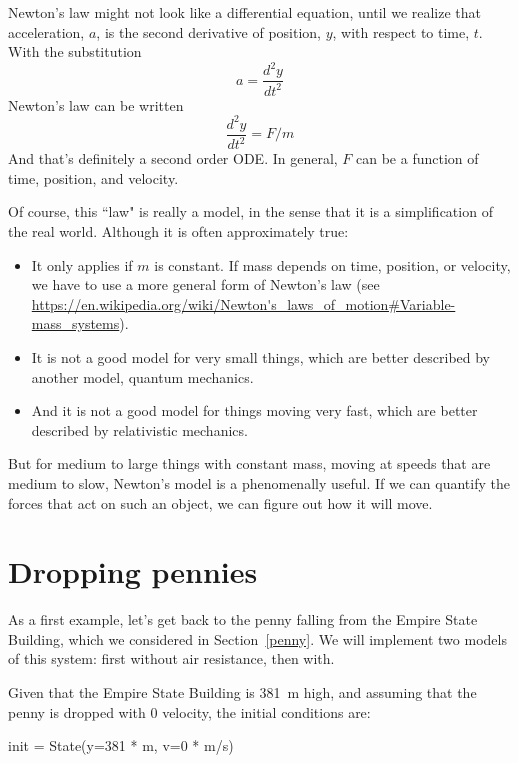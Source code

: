\documentclass[12pt]{book}
\theoremstyle{exercise}
\begin{document}
Newton's law might not look like a differential equation, until we realize that acceleration, $a$, is the second derivative of position, $y$, with respect to time, $t$.  With the substitution
%
\[ a = \frac{d^2y}{dt^2} \]
%
Newton's law can be written
%
\[ \frac{d^2y}{dt^2} = F / m \]
%
And that's definitely a second order ODE.  In general, $F$ can be a function of time, position, and velocity.

Of course, this ``law" is really a model, in the sense that it is a simplification of the real world.  Although it is often approximately true:

\begin{itemize}

\item It only applies if $m$ is constant.  If mass depends on time, position, or velocity, we have to use a more general form of Newton's law (see \url{https://en.wikipedia.org/wiki/Newton's_laws_of_motion#Variable-mass_systems}).

\item It is not a good model for very small things, which are better described by another model, quantum mechanics.

\item And it is not a good model for things moving very fast, which are better described by relativistic mechanics.

\end{itemize}

But for medium to large things with constant mass, moving at speeds that are medium to slow, Newton's model is a phenomenally useful.  If we can quantify the forces that act on such an object, we can figure out how it will move.


\section{Dropping pennies}

As a first example, let's get back to the penny falling from the Empire State Building, which we considered in Section~\ref{penny}.  We will implement two models of this system: first without air resistance, then with.

Given that the Empire State Building is \SI{381}{\meter} high, and assuming that the penny is dropped with 0 velocity, the initial conditions are:

\begin{python}
init = State(y=381 * m, 
             v=0 * m/s)
\end{python}
\end{document}
